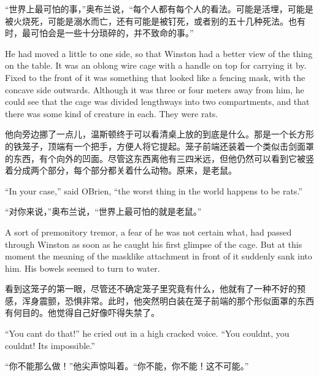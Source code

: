 \begin{paracol}{2}
\switchcolumn

``世界上最可怕的事，''奥布兰说，``每个人都有每个人的看法。可能是活埋，可能是被火烧死，可能是溺水而亡，还有可能是被钉死，或者别的五十几种死法。也有时，最可怕会是一些十分琐碎的，并不致命的事。''

\switchcolumn*

He had moved a little to one side, so that Winston had a better view of
the thing on the table. It was an oblong wire cage with a handle on top
for carrying it by. Fixed to the front of it was something that looked
like a fencing mask, with the concave side outwards. Although it was
three or four meters away from him, he could see that the cage was
divided lengthways into two compartments, and that there was some kind
of creature in each. They were rats.

\switchcolumn

他向旁边挪了一点儿，温斯顿终于可以看清桌上放的到底是什么。那是一个长方形的铁笼子，顶端有一个把手，方便人将它提起。笼子前端还装着一个类似击剑面罩的东西，有个向外的凹面。尽管这东西离他有三四米远，但他仍然可以看到它被竖着分成两个部分，每个部分都关着什么动物。原来，是老鼠。

\switchcolumn*

``In your case,'' said O\textquotesingle Brien, ``the worst thing in the
world happens to be rats.''

\switchcolumn

``对你来说，''奥布兰说，``世界上最可怕的就是老鼠。''

\switchcolumn*

A sort of premonitory tremor, a fear of he was not certain what, had
passed through Winston as soon as he caught his first glimpse of the
cage. But at this moment the meaning of the masklike attachment in front
of it suddenly sank into him. His bowels seemed to turn to water.

\switchcolumn

看到这笼子的第一眼，尽管还不确定笼子里究竟有什么，他就有了一种不好的预感，浑身震颤，恐惧非常。此时，他突然明白装在笼子前端的那个形似面罩的东西有何目的。他觉得自己好像吓得失禁了。

\switchcolumn*

``You can\textquotesingle t do that!'' he cried out in a high cracked
voice. ``You couldn\textquotesingle t, you couldn\textquotesingle t!
It\textquotesingle s impossible.''

\switchcolumn

``你不能那么做！''他尖声惊叫着。``你不能，你不能！这不可能。''


\end{paracol}

